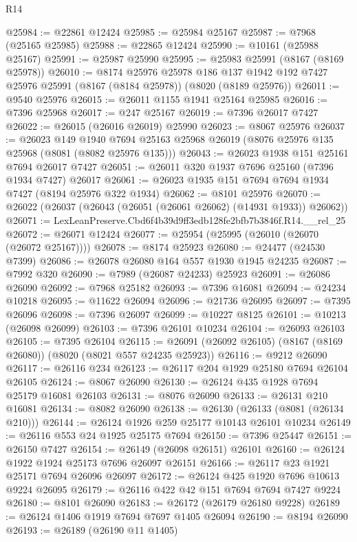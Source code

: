 \begin{lexlean}{R14}
\begin{coremodule}
@25984 := @22861 @12424
@25985 := @25984 @25167
@25987 := @7968 (@25165 @25985)
@25988 := @22865 @12424
@25990 := @10161 (@25988 @25167)
@25991 := @25987 @25990
@25995 := @25983 @25991 (@8167 (@8169 @25978))
@26010 := @8174
    @25976
    @25978
    @186
    @137
    @1942
    @192
    @7427
    @25976
    @25991
    (@8167 (@8184 @25978))
    (@8020 (@8189 @25976))
@26011 := @9540 @25976
@26015 := @26011 @1155 @1941 @25164 @25985
@26016 := @7396 @25968
@26017 := @247 @25167
@26019 := @7396 @26017 @7427
@26022 := @26015 (@26016 @26019) @25990
@26023 := @8067 @25976
@26037 := @26023
    @149
    @1940
    @7694
    @25163
    @25968
    @26019
    (@8076 @25976 @135 @25968 (@8081 (@8082 @25976 @135)))
@26043 := @26023 @1938 @151 @25161 @7694 @26017 @7427
@26051 := @26011 @320 @1937 @7696 @25160 (@7396 @1934 @7427) @26017
@26061 := @26023 @1935 @151 @7694 @7694 @1934 @7427 (@8194 @25976 @322 @1934)
@26062 := @8101 @25976
@26070 := @26022 (@26037 (@26043 (@26051 (@26061 @26062) (@14931 @1933)) @26062))
@26071 := LexLeanPreserve.Cbd6f4b39d9ff3edb128fe2bfb7b3846f.R14.__rel_25
@26072 := @26071 @12424
@26077 := @25954 (@25995 (@26010 (@26070 (@26072 @25167))))
@26078 := @8174 @25923
@26080 := @24477 (@24530 @7399)
@26086 := @26078 @26080 @164 @557 @1930 @1945 @24235
@26087 := @7992 @320
@26090 := @7989 (@26087 @24233) @25923
@26091 := @26086 @26090
@26092 := @7968 @25182
@26093 := @7396 @16081
@26094 := @24234 @10218
@26095 := @11622 @26094
@26096 := @21736 @26095
@26097 := @7395 @26096
@26098 := @7396 @26097
@26099 := @10227 @8125
@26101 := @10213 (@26098 @26099)
@26103 := @7396 @26101 @10234
@26104 := @26093 @26103
@26105 := @7395 @26104
@26115 := @26091 (@26092 @26105) (@8167 (@8169 @26080)) (@8020 (@8021 @557 @24235 @25923))
@26116 := @9212 @26090
@26117 := @26116 @234
@26123 := @26117 @204 @1929 @25180 @7694 @26104 @26105
@26124 := @8067 @26090
@26130 := @26124 @435 @1928 @7694 @25179 @16081 @26103
@26131 := @8076 @26090
@26133 := @26131 @210 @16081
@26134 := @8082 @26090
@26138 := @26130 (@26133 (@8081 (@26134 @210)))
@26144 := @26124 @1926 @259 @25177 @10143 @26101 @10234
@26149 := @26116 @553 @24 @1925 @25175 @7694
@26150 := @7396 @25447
@26151 := @26150 @7427
@26154 := @26149 (@26098 @26151) @26101
@26160 := @26124 @1922 @1924 @25173 @7696 @26097 @26151
@26166 := @26117 @23 @1921 @25171 @7694 @26096 @26097
@26172 := @26124 @425 @1920 @7696 @10613 @9224 @26095
@26179 := @26116 @422 @42 @151 @7694 @7694 @7427 @9224
@26180 := @8101 @26090
@26183 := @26172 (@26179 @26180 @9228)
@26189 := @26124 @1406 @1919 @7694 @7697 @1405 @26094
@26190 := @8194 @26090
@26193 := @26189 (@26190 @11 @1405)

\end{coremodule}
\end{lexlean}
